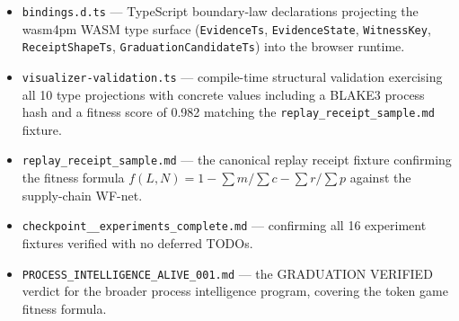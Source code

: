 \begin{itemize}
  \item \texttt{bindings.d.ts} — TypeScript boundary-law declarations projecting the wasm4pm
        WASM type surface (\texttt{EvidenceTs}, \texttt{EvidenceState}, \texttt{WitnessKey},
        \texttt{ReceiptShapeTs}, \texttt{GraduationCandidateTs}) into the browser runtime.
  \item \texttt{visualizer-validation.ts} — compile-time structural validation exercising all
        10 type projections with concrete values including a BLAKE3 process hash and a fitness
        score of 0.982 matching the \texttt{replay\_receipt\_sample.md} fixture.
  \item \texttt{replay\_receipt\_sample.md} — the canonical replay receipt fixture confirming
        the fitness formula $f(L,N) = 1 - \sum m / \sum c - \sum r / \sum p$ against the
        supply-chain WF-net.
  \item \texttt{checkpoint\_\_experiments\_complete.md} — confirming all 16 experiment fixtures
        verified with no deferred TODOs.
  \item \texttt{PROCESS\_INTELLIGENCE\_ALIVE\_001.md} — the GRADUATION VERIFIED verdict for the
        broader process intelligence program, covering the token game fitness formula.
\end{itemize}
